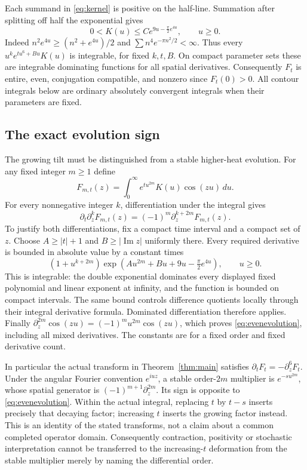 \documentclass[11pt]{article}
\begin{document}
Each summand in \eqref{eq:kernel} is positive on the
half-line. Summation after splitting off half the
exponential gives
\begin{equation}\label{eq:realdecay}
 0<K(u)\leq C e^{9u-\frac\pi2e^{4u}},\qquad u\geq0.
\end{equation}
Indeed $n^2e^{4u}\geq(n^2+e^{4u})/2$ and
$\sum n^4e^{-\pi n^2/2}<\infty$. Thus every
$u^k e^{tu^6+B u}K(u)$ is integrable, for fixed $k,t,B$.
On compact parameter sets these are integrable dominating
functions for all spatial derivatives. Consequently $F_t$
is entire, even, conjugation compatible, and nonzero since
$F_t(0)>0$. All contour integrals below are ordinary
absolutely convergent integrals when their parameters are fixed.

\subsection*{The exact evolution sign}
The growing tilt must be distinguished from a stable higher-heat
evolution. For any fixed integer $m\geq1$ define
\[
 F_{m,t}(z)=\int_0^\infty e^{tu^{2m}}K(u)\cos(zu)\,du.
\]
For every nonnegative integer $k$, differentiation under the integral
gives
\begin{equation}\label{eq:evenevolution}
 \partial_t\partial_z^kF_{m,t}(z)
       =(-1)^m\partial_z^{k+2m}F_{m,t}(z).
\end{equation}
To justify both differentiations, fix a compact time interval and a
compact set of $z$. Choose $A\geq |t|+1$ and $B\geq |\operatorname{Im}z|$
uniformly there. Every required derivative is bounded in absolute value
by a constant times
\[
 (1+u^{k+2m})\exp(Au^{2m}+Bu+9u-\tfrac\pi2e^{4u}),\qquad u\geq0.
\]
This is integrable: the double exponential dominates every displayed
fixed polynomial and linear exponent at infinity, and the function is
bounded on compact intervals. The same bound controls difference
quotients locally through their integral derivative formula.
Dominated differentiation therefore applies. Finally
$\partial_z^{2m}\cos(zu)=(-1)^mu^{2m}\cos(zu)$,
which proves \eqref{eq:evenevolution}, including all mixed derivatives.
The constants are for a fixed order and fixed derivative count.

In particular the actual transform in Theorem~\ref{thm:main} satisfies
$\partial_tF_t=-\partial_z^6F_t$.
Under the angular Fourier convention $e^{iuz}$, a stable order-$2m$
multiplier is $e^{-su^{2m}}$, whose spatial generator is
$(-1)^{m+1}\partial_z^{2m}$. Its sign is opposite to
\eqref{eq:evenevolution}. Within the actual integral, replacing $t$
by $t-s$ inserts precisely that decaying factor; increasing $t$
inserts the growing factor instead. This is an identity of the stated
transforms, not a claim about a common completed operator domain.
Consequently contraction, positivity or stochastic interpretation
cannot be transferred to the increasing-$t$ deformation from the
stable multiplier merely by naming the differential order.
\end{document}
